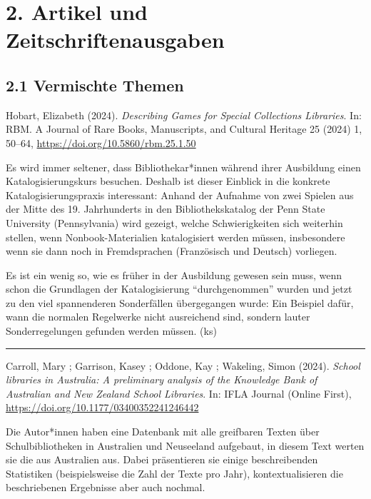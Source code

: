 \documentclass[a4paper,
fontsize=11pt,
oneside,
numbers=noperiodatend,
parskip=half-,
bibliography=totoc,
final
]{scrartcl}
\begin{document}
\section{2. Artikel und
Zeitschriftenausgaben}\label{artikel-und-zeitschriftenausgaben}

\subsection{2.1 Vermischte Themen}\label{vermischte-themen}

Hobart, Elizabeth (2024). \emph{Describing Games for Special Collections
Libraries}. In: RBM. A Journal of Rare Books, Manuscripts, and Cultural
Heritage 25 (2024) 1, 50--64, \url{https://doi.org/10.5860/rbm.25.1.50}

Es wird immer seltener, dass Bibliothekar*innen während ihrer Ausbildung
einen Katalogisierungskurs besuchen. Deshalb ist dieser Einblick in die
konkrete Katalogisierungspraxis interessant: Anhand der Aufnahme von
zwei Spielen aus der Mitte des 19. Jahrhunderts in den
Bibliothekskatalog der Penn State University (Pennsylvania) wird
gezeigt, welche Schwierigkeiten sich weiterhin stellen, wenn
Nonbook-Materialien katalogisiert werden müssen, insbesondere wenn sie
dann noch in Fremdsprachen (Französisch und Deutsch) vorliegen.

Es ist ein wenig so, wie es früher in der Ausbildung gewesen sein muss,
wenn schon die Grundlagen der Katalogisierung ``durchgenommen'' wurden
und jetzt zu den viel spannenderen Sonderfällen übergegangen wurde: Ein
Beispiel dafür, wann die normalen Regelwerke nicht ausreichend sind,
sondern lauter Sonderregelungen gefunden werden müssen. (ks)

\begin{center}\rule{0.5\linewidth}{0.5pt}\end{center}

Carroll, Mary ; Garrison, Kasey ; Oddone, Kay ; Wakeling, Simon (2024).
\emph{School libraries in Australia: A preliminary analysis of the
Knowledge Bank of Australian and New Zealand School Libraries}. In: IFLA
Journal (Online First), \url{https://doi.org/10.1177/03400352241246442}

Die Autor*innen haben eine Datenbank mit alle greifbaren Texten über
Schulbibliotheken in Australien und Neuseeland aufgebaut, in diesem Text
werten sie die aus Australien aus. Dabei präsentieren sie einige
beschreibenden Statistiken (beispielsweise die Zahl der Texte pro Jahr),
kontextualisieren die beschriebenen Ergebnisse aber auch nochmal.
\end{document}

